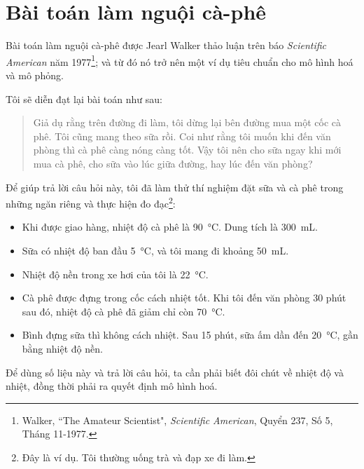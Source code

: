 \documentclass[12pt, openany]{book}
\theoremstyle{exercise}
\begin{document}

\section{Bài toán làm nguội cà-phê}

Bài toán làm nguội cà-phê được Jearl Walker thảo luận trên báo {\it Scientific American} năm 1977\footnote{Walker, ``The Amateur Scientist", {\it Scientific American}, Quyển 237, Số 5, Tháng 11-1977.}; và từ đó nó trở nên một ví dụ tiêu chuẩn cho mô hình hoá và mô phỏng.


Tôi sẽ diễn đạt lại bài toán như sau:

\begin{quote}
Giả dụ rằng trên đường đi làm, tôi dừng lại bên đường mua một cốc cà phê. Tôi cũng mang theo sữa rồi. Coi như rằng tôi muốn khi đến văn phòng thì cà phê càng nóng càng tốt. Vậy tôi nên cho sữa ngay khi mới mua cà phê, cho sữa vào lúc giữa đường, hay lúc đến văn phòng?
\end{quote}

Để giúp trả lời câu hỏi này, tôi đã làm thử thí nghiệm đặt sữa và cà phê trong những ngăn riêng và thực hiện đo đạc\footnote{Đây là ví dụ. Tôi thường uống trà và đạp xe đi làm.}:

\begin{itemize}

\item Khi được giao hàng, nhiệt độ cà phê là \SI{90}{\celsius}.  Dung tích là \SI{300}{mL}.

\item Sữa có nhiệt độ ban đầu \SI{5}{\celsius}, và tôi mang đi khoảng \SI{50}{mL}.

\item Nhiệt độ nền trong xe hơi của tôi là \SI{22}{\celsius}.

\item Cà phê được đựng trong cốc cách nhiệt tốt. Khi tôi đến văn phòng 30 phút sau đó, nhiệt độ cà phê đã giảm chỉ còn \SI{70}{\celsius}.

\item Bình đựng sữa thì không cách nhiệt. Sau 15 phút, sữa ấm dần đến \SI{20}{\celsius}, gần bằng nhiệt độ nền.

\end{itemize}

Để dùng số liệu này và trả lời câu hỏi, ta cần phải biết đôi chút về nhiệt độ và nhiệt, đồng thời phải ra quyết định mô hình hoá.
\end{document}
